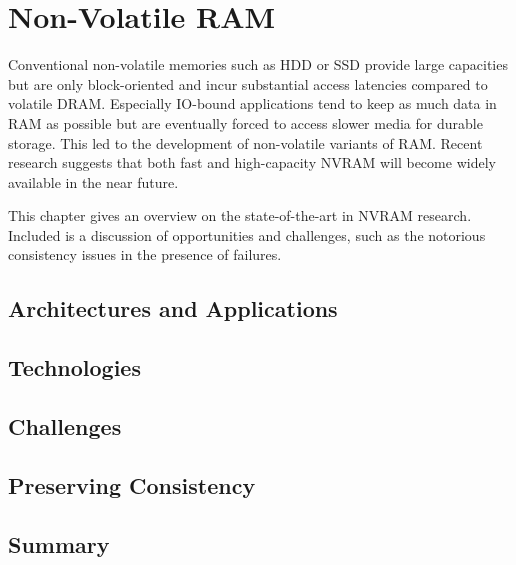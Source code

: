 \chapter{Non-Volatile RAM}
\label{ch:nvram}

Conventional non-volatile memories such as HDD or SSD provide large capacities but are only block-oriented and incur substantial access latencies compared to volatile DRAM. Especially IO-bound applications tend to keep as much data in RAM as possible but are eventually forced to access slower media for durable storage. This led to the development of non-volatile variants of RAM. Recent research suggests that both fast and high-capacity NVRAM will become widely available in the near future.

This chapter gives an overview on the state-of-the-art in NVRAM research.
Included is a discussion of opportunities and challenges, such as the notorious
consistency issues in the presence of failures.

\section{Architectures and Applications}


\section{Technologies}


\section{Challenges}


\section{Preserving Consistency}


\section{Summary}

